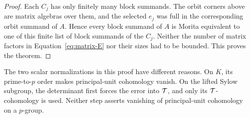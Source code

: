 \begin{proof}
Each $C_j$ has only finitely many block summands.  The
orbit corners above are matrix algebras over them, and
the selected $e_j$ was full in the corresponding orbit
summand of $A$.  Hence every block summand of $A$ is
Morita equivalent to one of this finite list of block
summands of the $C_j$.  Neither the number of matrix
factors in Equation~\eqref{eq:matrix-E} nor their sizes
had to be bounded.  This proves the theorem.
\end{proof}

The two scalar normalizations in this proof have different reasons.
On $K$, its prime-to-$p$ order makes principal-unit cohomology vanish.
On the lifted Sylow subgroup, the determinant first forces the error
into $\mathcal T$, and only its $\mathcal T$-cohomology is used.  Neither step asserts
vanishing of principal-unit cohomology on a $p$-group.
